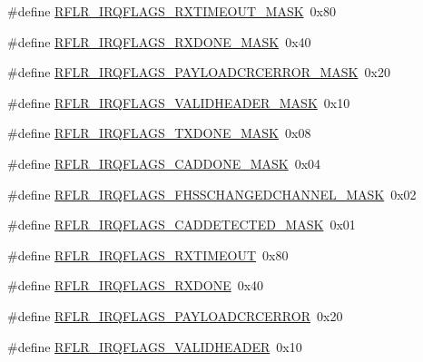 \begin{DoxyCompactItemize}
\item 
\#define \hyperlink{sx1276Regs-LoRa_8h_ab60607459cabba892de2c685a14786ff}{R\+F\+L\+R\+\_\+\+I\+R\+Q\+F\+L\+A\+G\+S\+\_\+\+R\+X\+T\+I\+M\+E\+O\+U\+T\+\_\+\+M\+A\+SK}~0x80
\item 
\#define \hyperlink{sx1276Regs-LoRa_8h_aaed938b05c39afb8a66f7abc7bd31a9e}{R\+F\+L\+R\+\_\+\+I\+R\+Q\+F\+L\+A\+G\+S\+\_\+\+R\+X\+D\+O\+N\+E\+\_\+\+M\+A\+SK}~0x40
\item 
\#define \hyperlink{sx1276Regs-LoRa_8h_a4e2618c340d93f8bfd19f8634f7a63b3}{R\+F\+L\+R\+\_\+\+I\+R\+Q\+F\+L\+A\+G\+S\+\_\+\+P\+A\+Y\+L\+O\+A\+D\+C\+R\+C\+E\+R\+R\+O\+R\+\_\+\+M\+A\+SK}~0x20
\item 
\#define \hyperlink{sx1276Regs-LoRa_8h_a7d3583b774d3514d985a6f8acb6cd7c7}{R\+F\+L\+R\+\_\+\+I\+R\+Q\+F\+L\+A\+G\+S\+\_\+\+V\+A\+L\+I\+D\+H\+E\+A\+D\+E\+R\+\_\+\+M\+A\+SK}~0x10
\item 
\#define \hyperlink{sx1276Regs-LoRa_8h_adeb3e1c7ad35e4b4ab4ea7cd9050c2e6}{R\+F\+L\+R\+\_\+\+I\+R\+Q\+F\+L\+A\+G\+S\+\_\+\+T\+X\+D\+O\+N\+E\+\_\+\+M\+A\+SK}~0x08
\item 
\#define \hyperlink{sx1276Regs-LoRa_8h_a5af8031790e4a1d7c3703fb4f834b21d}{R\+F\+L\+R\+\_\+\+I\+R\+Q\+F\+L\+A\+G\+S\+\_\+\+C\+A\+D\+D\+O\+N\+E\+\_\+\+M\+A\+SK}~0x04
\item 
\#define \hyperlink{sx1276Regs-LoRa_8h_ae0250cb5809f0702a43eb235823acc44}{R\+F\+L\+R\+\_\+\+I\+R\+Q\+F\+L\+A\+G\+S\+\_\+\+F\+H\+S\+S\+C\+H\+A\+N\+G\+E\+D\+C\+H\+A\+N\+N\+E\+L\+\_\+\+M\+A\+SK}~0x02
\item 
\#define \hyperlink{sx1276Regs-LoRa_8h_a0d8e41b65bd4af8f19dfad50b7dcad97}{R\+F\+L\+R\+\_\+\+I\+R\+Q\+F\+L\+A\+G\+S\+\_\+\+C\+A\+D\+D\+E\+T\+E\+C\+T\+E\+D\+\_\+\+M\+A\+SK}~0x01
\item 
\#define \hyperlink{sx1276Regs-LoRa_8h_a12d5b2ce439396e7033053c929b815bf}{R\+F\+L\+R\+\_\+\+I\+R\+Q\+F\+L\+A\+G\+S\+\_\+\+R\+X\+T\+I\+M\+E\+O\+UT}~0x80
\item 
\#define \hyperlink{sx1276Regs-LoRa_8h_a7bdc1e0f642b272cef8fc3f81ab8d95e}{R\+F\+L\+R\+\_\+\+I\+R\+Q\+F\+L\+A\+G\+S\+\_\+\+R\+X\+D\+O\+NE}~0x40
\item 
\#define \hyperlink{sx1276Regs-LoRa_8h_a2b91f96d488f7d08d8fd543a7a5eb76b}{R\+F\+L\+R\+\_\+\+I\+R\+Q\+F\+L\+A\+G\+S\+\_\+\+P\+A\+Y\+L\+O\+A\+D\+C\+R\+C\+E\+R\+R\+OR}~0x20
\item 
\#define \hyperlink{sx1276Regs-LoRa_8h_a56f64bf676430c4ce2cc672d3bfde2b8}{R\+F\+L\+R\+\_\+\+I\+R\+Q\+F\+L\+A\+G\+S\+\_\+\+V\+A\+L\+I\+D\+H\+E\+A\+D\+ER}~0x10
\item 

\end{DoxyCompactItemize}
